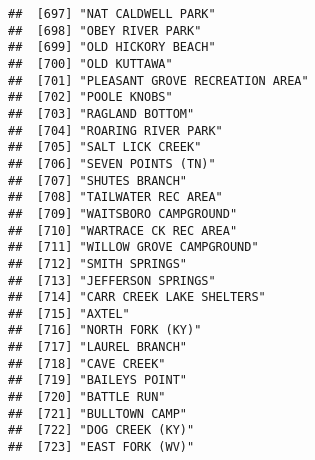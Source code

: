 \documentclass[
]{article}
\begin{document}
\begin{verbatim}
##  [697] "NAT CALDWELL PARK"                                                                   
##  [698] "OBEY RIVER PARK"                                                                     
##  [699] "OLD HICKORY BEACH"                                                                   
##  [700] "OLD KUTTAWA"                                                                         
##  [701] "PLEASANT GROVE RECREATION AREA"                                                      
##  [702] "POOLE KNOBS"                                                                         
##  [703] "RAGLAND BOTTOM"                                                                      
##  [704] "ROARING RIVER PARK"                                                                  
##  [705] "SALT LICK CREEK"                                                                     
##  [706] "SEVEN POINTS (TN)"                                                                   
##  [707] "SHUTES BRANCH"                                                                       
##  [708] "TAILWATER REC AREA"                                                                  
##  [709] "WAITSBORO CAMPGROUND"                                                                
##  [710] "WARTRACE CK REC AREA"                                                                
##  [711] "WILLOW GROVE CAMPGROUND"                                                             
##  [712] "SMITH SPRINGS"                                                                       
##  [713] "JEFFERSON SPRINGS"                                                                   
##  [714] "CARR CREEK LAKE SHELTERS"                                                            
##  [715] "AXTEL"                                                                               
##  [716] "NORTH FORK (KY)"                                                                     
##  [717] "LAUREL BRANCH"                                                                       
##  [718] "CAVE CREEK"                                                                          
##  [719] "BAILEYS POINT"                                                                       
##  [720] "BATTLE RUN"                                                                          
##  [721] "BULLTOWN CAMP"                                                                       
##  [722] "DOG CREEK (KY)"                                                                      
##  [723] "EAST FORK (WV)"                                                                      

\end{verbatim}
\end{document}
